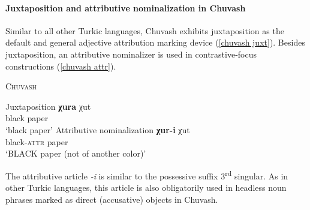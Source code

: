 \paragraph{Juxtaposition and attributive nominalization in Chuvash} \label{chuvash synchr}
Similar to all other Turkic languages, Chuvash exhibits juxtaposition as the default and general adjective attribution marking device (\ref{chuvash juxt}). Besides juxtaposition, an attributive nominalizer is used in contrastive-focus constructions (\ref{chuvash attr}).
\begin{exe}
\ex	\textsc{Chuvash} \citep{clark1998a}
\begin{xlist}
\ex 	Juxtaposition \label{chuvash juxt}
\gll	\textbf{χura} χut\\
	black paper\\
\glt	‘black paper’
\ex	Attributive nominalization \label{chuvash attr}
\gll	\textbf{χur-i} χut\\					 		
	black-\textsc{attr} paper\\
\glt	‘BLACK paper (not of another color)’
\end{xlist}
\end{exe}
The attributive article \textit{-i} is similar to the possessive suffix 3\textsuperscript{rd} singular. As in other Turkic languages, this article is also obligatorily used in headless noun phrases marked as direct (accusative) objects in Chuvash.

